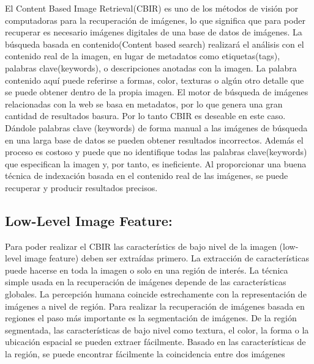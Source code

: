 \documentclass{llncs}
\begin{document}
El Content Based Image Retrieval(CBIR) es uno de los m\'etodos de visi\'on por computadoras para la recuperaci\'on de
im\'agenes, lo que significa que para poder recuperar es necesario im\'agenes digitales de una base de datos de im\'agenes. 
La b\'usqueda basada en contenido(Content based search) realizar\'a el an\'alisis con el contenido real de la imagen, en 
lugar de metadatos como etiquetas(tags), palabras clave(keywords), o descripciones anotadas con la imagen. La palabra 
contenido aqu\'i puede referirse a formas, color, texturas o alg\'un otro detalle que se puede obtener dentro de la propia
imagen. El motor de búsqueda de imágenes relacionadas con la web se basa en metadatos, por lo que genera una gran cantidad 
de resultados basura. Por lo tanto CBIR es deseable en este caso. D\'andole palabras clave (keywords) de forma manual a las 
im\'agenes de b\'usqueda en una larga base de datos se pueden obtener resultados incorrectos. Adem\'as el proceso es costoso y 
puede que no identifique todas las palabras clave(keywords) que especifican la imagen y, por tanto, es ineficiente. Al 
proporcionar una buena técnica de indexación basada en el contenido real de las imágenes, se puede recuperar y producir
resultados precisos.


\subsection{Low-Level Image Feature:}

Para poder realizar el CBIR las caracter\'istics de bajo nivel de la imagen  (low-level image feature) deben ser extra\'idas 
primero. La extracci\'on de caracter\'isticas puede hacerse en toda la imagen o solo en una regi\'on de inter\'es. La t\'ecnica
simple usada en la recuperaci\'on de im\'agenes depende de las caracter\'isticas globales. La percepci\'on humana coincide 
estrechamente con la representaci\'on de im\'agenes a nivel de regi\'on. Para realizar la recuperaci\'on de im\'agenes 
basada en regiones el paso m\'as importante es la segmentaci\'on de im\'agenes. De la regi\'on segmentada, las caracter\'isticas 
de bajo nivel como textura, el color, la forma o la ubicaci\'on espacial se pueden extraer f\'acilmente. Basado en las caracter\'isticas
de la regi\'on, se puede encontrar f\'acilmente la coincidencia entre dos im\'agenes 
\end{document}
